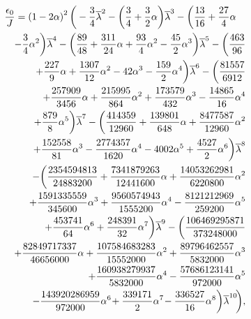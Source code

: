 \begin{eqnarray}
\nonumber
\lefteqn{\frac{\epsilon_0}{J} = \left(1 - 2{}\alpha \right)^2
\bigg(
- {\displaystyle \frac {3}{4}} {}\overline{\lambda} ^{2}
- \bigg( {\displaystyle \frac {3}{4}}  
+ {\displaystyle \frac {3}{2}} {}\alpha \bigg)
{}\overline{\lambda} ^{3}  
- \bigg({\displaystyle \frac {13}{16}}
+ {\displaystyle \frac {27}{4}} {}\alpha}
\\ \nonumber
& &
- {\displaystyle \frac {3}{4}} {}\alpha ^{2}\bigg){}\overline{\lambda} ^{4} 
- \bigg(
 {\displaystyle \frac {89}{48}}  
+ {\displaystyle \frac {311}{24}} {}\alpha  
+ {\displaystyle \frac {93}{4}} {}\alpha ^{2} 
- {\displaystyle \frac {45}{2}} {}\alpha ^{3}\bigg){}\overline{\lambda} ^{5}
- \bigg( {\displaystyle \frac {463}{96}}
\\ \nonumber
& &
+ {\displaystyle \frac {227}{9}} {}\alpha 
+ {\displaystyle \frac {1307}{12}} {}\alpha ^{2} 
- 42{}\alpha ^{3} 
- {\displaystyle \frac {159}{2}} {}\alpha ^{4}\bigg){}\overline{\lambda}^{6}
- \bigg({\displaystyle \frac {81557}{6912}}
\\ \nonumber
& & 
+ {\displaystyle \frac {257909}{3456}} {}\alpha  
+ {\displaystyle \frac {215995}{864}} {}\alpha ^{2}
+ {\displaystyle \frac {173579}{432}} {}\alpha ^{3} 
- {\displaystyle \frac {14865}{16}} {}\alpha ^{4}
\\ \nonumber
& & 
+ {\displaystyle \frac {879}{8}} {}\alpha ^{5}  
\bigg)
\overline{\lambda} ^{7}
- \bigg( {\displaystyle \frac {414359}{12960}}
+ {\displaystyle \frac {139801}{648}} {}\alpha 
+ {\displaystyle \frac {8477587}{12960}} {}\alpha ^{2} 
\\ \nonumber
& & 
+ {\displaystyle \frac {152558}{81}} {}\alpha ^{3} 
- {\displaystyle \frac {2774357}{1620}} {}\alpha ^{4}
- 4002{}\alpha ^{5} 
+ {\displaystyle \frac {4527}{2}} {}\alpha ^{6}\bigg)
\overline{\lambda} ^{8}
\\ \nonumber
& & 
- \bigg( {\displaystyle \frac {2354594813}{24883200}}  
+ {\displaystyle \frac {7341879263}{12441600}} {}\alpha 
+ {\displaystyle \frac {14053262981}{6220800}} {}\alpha ^{2} 
\\ \nonumber
& & 
+ {\displaystyle \frac {1591335559}{345600}} {}\alpha ^{3}
+ {\displaystyle \frac {9560574943}{1555200}} {}\alpha ^{4}
- {\displaystyle \frac {8121212969}{259200}} {} \alpha ^{5}
\\\nonumber
& &  
+ {\displaystyle \frac {453741}{64}} {}\alpha ^{6}
+ {\displaystyle \frac {248391}{32}} {} \alpha ^{7} 
\bigg)\overline{\lambda} ^{9} 
- \bigg({\displaystyle \frac {106469295871}{373248000}} 
\\\nonumber 
& & 
+ {\displaystyle \frac {82849717337}{46656000}} {} \alpha
+ {\displaystyle \frac {107584683283}{15552000}} {}\alpha ^{2}
+ {\displaystyle \frac {89796462557}{5832000}} {}\alpha ^{3}
\\\nonumber
& & 
+ {\displaystyle \frac {160938279937}{5832000}} {}\alpha ^{4}
- {\displaystyle \frac {57686123141}{972000}} {}\alpha ^{5}
\\\label{E_grund}
& &   
- {\displaystyle \frac {143920286959}{972000}} {}\alpha ^{6}\!
+ {\displaystyle \frac {339171}{2}} {}\alpha ^{7}\!
- {\displaystyle \frac {336527}{16}} {}\alpha ^{8} 
\bigg)\overline{\lambda} ^{10} \!
\bigg) ,
\end{eqnarray}
